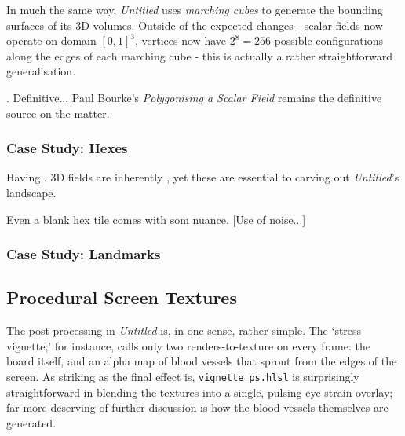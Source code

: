 \documentclass[a4paper, 11pt]{article}
\begin{document}
\begin{flushleft}
\vspace{5pt}\noindent
In much the same way, \textit{Untitled} uses \textit{marching cubes} to generate the bounding surfaces of its 3D volumes. Outside of the expected changes - scalar fields now operate on domain $[0,1]^3$, vertices now have $2^8 = 256$ possible configurations along the edges of each marching cube - this is actually a rather straightforward generalisation.

\vspace{5pt}. Definitive... Paul Bourke's \textit{Polygonising a Scalar Field} \citeyearpar{bourkeMarchingCubes} remains the definitive source on the matter. %

\subsubsection{Case Study: Hexes}

Having . 3D fields are inherently , yet these are essential to carving out \textit{Untitled}'s landscape.

\vspace{5pt}\noindent
Even a blank hex tile comes with som nuance. [Use of noise...]

\vspace{5pt} 

\subsubsection{Case Study: Landmarks}

\subsection{Procedural Screen Textures}\label{Procedural Screen Textures} %

The post-processing in \textit{Untitled} is, in one sense, rather simple. The `stress vignette,' for instance, calls only two renders-to-texture on every frame: the board itself, and an alpha map of blood vessels that sprout from the edges of the screen. As striking as the final effect is, \texttt{vignette\_ps.hlsl} is surprisingly straightforward in blending the textures into a single, pulsing eye strain overlay; far more deserving of further discussion is how the blood vessels themselves are generated.


\end{flushleft}
\end{document}
